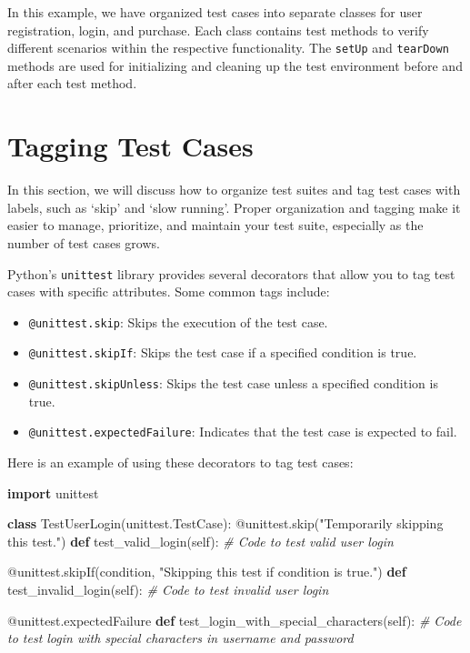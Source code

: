 \documentclass[
  paper=a4,
  ,captions=tableheading
]{scrartcl}
\newenvironment{Shaded}{}{}
\newcommand{\AttributeTok}[1]{\textcolor[rgb]{0.49,0.56,0.16}{#1}}
\newcommand{\CommentTok}[1]{\textcolor[rgb]{0.38,0.63,0.69}{\textit{#1}}}
\newcommand{\ImportTok}[1]{\textcolor[rgb]{0.00,0.50,0.00}{\textbf{#1}}}
\newcommand{\KeywordTok}[1]{\textcolor[rgb]{0.00,0.44,0.13}{\textbf{#1}}}
\newcommand{\NormalTok}[1]{#1}
\newcommand{\StringTok}[1]{\textcolor[rgb]{0.25,0.44,0.63}{#1}}
\newcommand{\VariableTok}[1]{\textcolor[rgb]{0.10,0.09,0.49}{#1}}
\providecommand{\tightlist}{%
  \setlength{\itemsep}{0pt}\setlength{\parskip}{0pt}}
\begin{document}
In this example, we have organized test cases into separate classes for
user registration, login, and purchase. Each class contains test methods
to verify different scenarios within the respective functionality. The
\texttt{setUp} and \texttt{tearDown} methods are used for initializing
and cleaning up the test environment before and after each test method.

\hypertarget{tagging-test-cases}{%
\section{Tagging Test Cases}\label{tagging-test-cases}}

In this section, we will discuss how to organize test suites and tag
test cases with labels, such as `skip' and `slow running'. Proper
organization and tagging make it easier to manage, prioritize, and
maintain your test suite, especially as the number of test cases grows.

Python's \texttt{unittest} library provides several decorators that
allow you to tag test cases with specific attributes. Some common tags
include:

\begin{itemize}
\tightlist
\item
  \texttt{@unittest.skip}: Skips the execution of the test case.
\item
  \texttt{@unittest.skipIf}: Skips the test case if a specified
  condition is true.
\item
  \texttt{@unittest.skipUnless}: Skips the test case unless a specified
  condition is true.
\item
  \texttt{@unittest.expectedFailure}: Indicates that the test case is
  expected to fail.
\end{itemize}

Here is an example of using these decorators to tag test cases:

\begin{Shaded}
\begin{Highlighting}[]
\ImportTok{import}\NormalTok{ unittest}

\KeywordTok{class}\NormalTok{ TestUserLogin(unittest.TestCase):}
    \AttributeTok{@unittest.skip}\NormalTok{(}\StringTok{"Temporarily skipping this test."}\NormalTok{)}
    \KeywordTok{def}\NormalTok{ test\_valid\_login(}\VariableTok{self}\NormalTok{):}
        \CommentTok{\# Code to test valid user login}

    \AttributeTok{@unittest.skipIf}\NormalTok{(condition, }\StringTok{"Skipping this test if condition is true."}\NormalTok{)}
    \KeywordTok{def}\NormalTok{ test\_invalid\_login(}\VariableTok{self}\NormalTok{):}
        \CommentTok{\# Code to test invalid user login}

    \AttributeTok{@unittest.expectedFailure}
    \KeywordTok{def}\NormalTok{ test\_login\_with\_special\_characters(}\VariableTok{self}\NormalTok{):}
        \CommentTok{\# Code to test login with special characters in username and password}
\end{Highlighting}
\end{Shaded}
\end{document}
